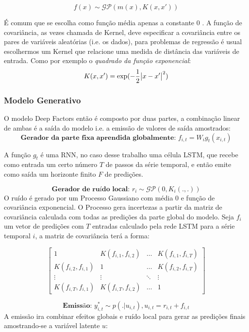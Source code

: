 \[
f(x) \sim \mathcal{GP}( m(x), K(x,x'))
\]

É comum que se escolha como função média apenas a constante 0 \citep{gpml}.  A função de covariância, as vezes chamada de Kernel, deve especificar a covariância entre os pares de variáveis aleatórias (i.e. os dados), para problemas de regressão é usual escolhermos um Kernel que relacione uma medida de distância das variáveis de entrada. Como por exemplo o \textit{quadrado da função exponencial}: \\

\[
  K(x,x') = \exp(-\frac{1}{2}\abs{x - x'}^2)
\]


\subsubsection{Modelo Generativo}

O modelo Deep Factors então é composto por duas partes, a combinação linear de ambas é a saída do modelo i.e. a emissão de valores de saída amostrados: \\

\[
  \textbf{Gerador da parte fixa aprendida globalmente: }  f_{i,t} = W_ig_t(x_{i,t})
\]

A função $g_t$ é uma RNN, no caso desse trabalho uma célula LSTM, que recebe como entrada um certo número $T$ de passos da série temporal, e então emite como saída um horizonte finito $F$ de predições.


\[
  \textbf{Gerador de ruído local: }  r_i \sim \mathcal{GP} (0, K_i(.,.))
\]
O ruído é gerado por um Processo Gaussiano com média 0 e função de covariância
exponencial. O Processo gera incertezas a partir da matriz de covariância
calculada com todas as predições da parte global do modelo. Seja $f_i$ um vetor
de predições com $T$ entradas calculado pela rede LSTM para a série temporal $i$, a matriz de covariância
terá a forma:  

\[
  \begin{bmatrix}
    1& K(f_{i,1},f_{i,2}) & \dots &K(f_{i,1},f_{i,T}) \\ 
    K(f_{i,2},f_{i,1}) &1  & \dots & K(f_{i,2},f_{i,T})\\ 
    \vdots &  \vdots  & \ddots & \vdots\\
    K(f_{i,T},f_{i,1})& K(f_{i,T},f_{i,2}) & \dots & 1 
  \end{bmatrix} 
\]

\[
  \textbf{Emissão: }  y^*_{i,t} \sim p(. | u_{i,t}) , u_{i,t} = r_{i,t} + f_{i,t}  
\]
A emissão ira combinar efeitos globais e ruído local para gerar as predições
finais amostrando-se a variável latente $u$:
  

